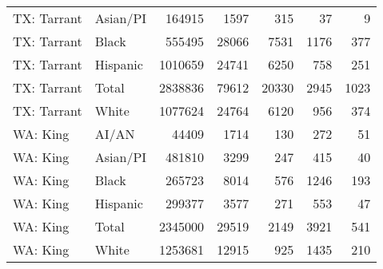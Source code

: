 \documentclass[9pt,twoside,lineno]{pnas-new}
\begin{document}
\begin{table}[ht]
\begin{tabular}{llrrrrr}
  TX: Tarrant & Asian/PI & 164915 & 1597 & 315 & 37 & 9 \\ 
  TX: Tarrant & Black & 555495 & 28066 & 7531 & 1176 & 377 \\ 
  TX: Tarrant & Hispanic & 1010659 & 24741 & 6250 & 758 & 251 \\ 
  TX: Tarrant & Total & 2838836 & 79612 & 20330 & 2945 & 1023 \\ 
  TX: Tarrant & White & 1077624 & 24764 & 6120 & 956 & 374 \\ 
  WA: King & AI/AN & 44409 & 1714 & 130 & 272 & 51 \\ 
  WA: King & Asian/PI & 481810 & 3299 & 247 & 415 & 40 \\ 
  WA: King & Black & 265723 & 8014 & 576 & 1246 & 193 \\ 
  WA: King & Hispanic & 299377 & 3577 & 271 & 553 & 47 \\ 
  WA: King & Total & 2345000 & 29519 & 2149 & 3921 & 541 \\ 
  WA: King & White & 1253681 & 12915 & 925 & 1435 & 210 \\ 
   \hline
\end{tabular}
\end{table}
\end{document}
